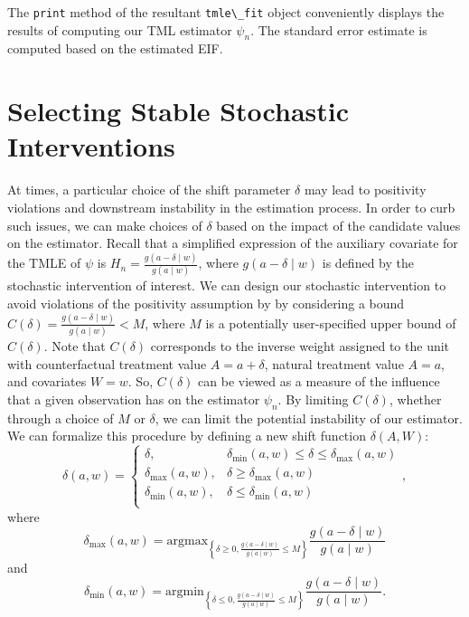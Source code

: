 \documentclass[
  12pt, krantz2,
]{krantz}
\newcommand{\passthrough}[1]{#1}
\theoremstyle{definition}
\theoremstyle{definition}
\theoremstyle{definition}
\newcommand{\1}{\mathbbm{1}}
\begin{document}
The \passthrough{\lstinline!print!} method of the resultant \passthrough{\lstinline!tmle\_fit!} object conveniently displays the
results of computing our TML estimator \(\psi_n\). The standard error estimate
is computed based on the estimated EIF.

\hypertarget{selecting-stable-stochastic-interventions}{%
\section{Selecting Stable Stochastic Interventions}\label{selecting-stable-stochastic-interventions}}

At times, a particular choice of the shift parameter \(\delta\) may lead to
positivity violations and downstream instability in the estimation process. In
order to curb such issues, we can make choices of \(\delta\) based on the impact
of the candidate values on the estimator. Recall that a simplified expression of
the auxiliary covariate for the TMLE of \(\psi\) is \(H_n = \frac{g(a - \delta \mid w)}{g(a \mid w)}\), where \(g(a - \delta \mid w)\) is defined by the stochastic
intervention of interest. We can design our stochastic intervention to avoid
violations of the positivity assumption by by considering a bound \(C(\delta) = \frac{g(a - \delta \mid w)}{g(a \mid w)} < M\), where \(M\) is a potentially
user-specified upper bound of \(C(\delta)\). Note that \(C(\delta)\) corresponds to
the inverse weight assigned to the unit with counterfactual treatment value \(A = a + \delta\), natural treatment value \(A = a\), and covariates \(W = w\). So,
\(C(\delta)\) can be viewed as a measure of the influence that a given observation
has on the estimator \(\psi_n\). By limiting \(C(\delta)\), whether through a choice
of \(M\) or \(\delta\), we can limit the potential instability of our estimator. We
can formalize this procedure by defining a new shift function \(\delta(A, W)\):
\begin{equation}
  \delta(a, w) =
    \begin{cases}
      \delta, & \delta_{\text{min}}(a,w) \leq \delta \leq
        \delta_{\text{max}}(a,w) \\
      \delta_{\text{max}}(a,w), & \delta \geq \delta_{\text{max}}(a,w) \\
      \delta_{\text{min}}(a,w), & \delta \leq \delta_{\text{min}}(a,w) \\
    \end{cases},
    \label{eq:delta-min-max-shift}
\end{equation}
where \[\delta_{\text{max}}(a, w) = \text{argmax}_{\left\{\delta \geq 0,
\frac{g(a - \delta \mid w)}{g(a \mid w)} \leq M \right\}} \frac{g(a - \delta
\mid w)}{g(a \mid w)}\] and
\[\delta_{\text{min}}(a, w) = \text{argmin}_{\left\{\delta \leq 0,
\frac{g(a - \delta \mid w)}{g(a \mid w)} \leq M \right\}} \frac{g(a - \delta
\mid w)}{g(a \mid w)}.\]
\end{document}
